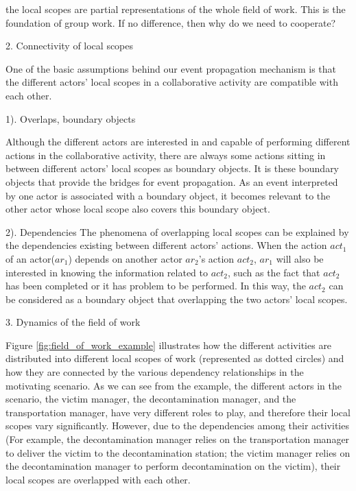the local scopes are partial representations of the whole field of work.  This is the foundation of group work. If no difference, then why do we need to cooperate?

2. Connectivity of local scopes

One of the basic assumptions behind our event propagation mechanism is that the different actors' local scopes in a collaborative activity are compatible with each other. 

1). Overlaps, boundary objects

Although the different actors are interested in and capable of performing different actions in the collaborative activity, there are always some actions sitting in between different actors' local scopes as boundary objects. It is these boundary objects that provide the bridges for event propagation. As an event interpreted by one actor is associated with a boundary object, it becomes relevant to the other actor whose local scope also covers this boundary object. 

2). Dependencies
The phenomena of overlapping local scopes can be explained by the dependencies existing between different actors' actions. When the action $act_1$ of an actor($ar_1$) depends on another actor $ar_2$'s action $act_2$, $ar_1$ will also be interested in knowing the information related to $act_2$, such as the fact that $act_2$ has been completed or it has problem to be performed. In this way, the $act_2$ can be considered as a boundary object that overlapping the two actors' local scopes. 

3. Dynamics of the field of work



Figure \ref{fig:field_of_work_example} illustrates how the different activities are distributed into different local scopes of work (represented as dotted circles) and how they are connected by the various dependency relationships in the motivating scenario. As we can see from the example, the different actors in the scenario, the victim manager, the decontamination manager, and the transportation manager, have very different roles to play, and therefore their local scopes vary significantly. However, due to the dependencies among their activities (For example, the decontamination manager relies on the transportation manager to deliver the victim to the decontamination station; the victim manager relies on the decontamination manager to perform decontamination on the victim), their local scopes are overlapped with each other.


